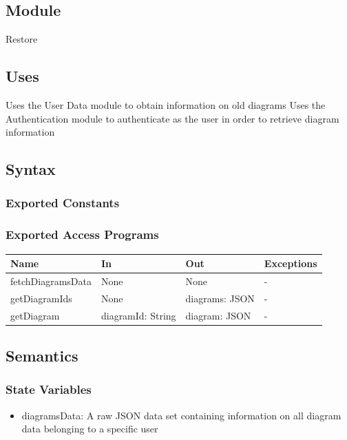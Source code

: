 \documentclass[12pt, titlepage]{article}
\begin{document}
\subsection{Module}

Restore

\subsection{Uses}
Uses the User Data module to obtain information on old diagrams
Uses the Authentication module to authenticate as the user in order to retrieve diagram information

\subsection{Syntax}

\subsubsection{Exported Constants}

\subsubsection{Exported Access Programs}

\begin{center}
\begin{tabular}{p{4cm} p{4cm} p{4cm} p{2cm}}
\hline
\textbf{Name} & \textbf{In} & \textbf{Out} & \textbf{Exceptions} \\
\hline
fetchDiagramsData & None & None & - \\
getDiagramIds & None & diagrams: JSON & - \\
getDiagram & diagramId: String & diagram: JSON & - \\
\hline
\end{tabular}
\end{center}

\subsection{Semantics}

\subsubsection{State Variables}

\begin{itemize}
  \item diagramsData: A raw JSON data set containing information on all diagram data belonging to a specific user
\end{itemize}
\end{document}
